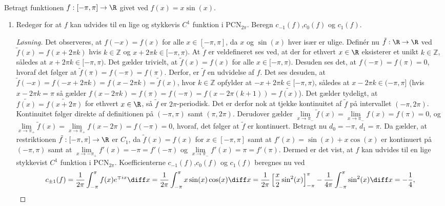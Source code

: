 \setcounter{section}{4}

\begin{opg}\hfill \\
	Betragt funktionen $ f:[-\pi,\pi]\to \R $ givet ved $ f(x)=x\sin(x) $.
	\begin{enumerate}
		\item Redegør for at $ f $ kan udvides til en lige og stykkevis $ C^1 $ funktion i $ \text{PCN}_{2\pi} $. Beregn $ c_{-1}(f) $,$ c_0(f) $ og $ c_1(f) $.
		\ifanswers
		\begin{proof}[Løsning]
			Det observeres, at $ f(-x)=f(x) $ for alle $ x\in[-\pi,\pi] $, da $ x $ og $ \sin(x) $ hver især er ulige. Definér nu $ \tilde{f}:\R\to\R $ ved $ \tilde{f}(x)=f(x+2\pi k) $ hvis $ k\in\mathbb{Z} $ og $ x+2\pi k\in[-\pi,\pi) $. At $ \tilde{f} $ er veldefineret ses ved, at der for ethvert $ x\in\R $ eksisterer et unikt $ k\in\mathbb{Z} $, således at $ x+2\pi k\in [-\pi,\pi) $.
			Det gælder trivielt, at $ \tilde{f}(x)=f(x) $ for alle $ x\in[-\pi,\pi) $. Desuden ses det, at $ f(-\pi)=f(\pi)=0 $, hvoraf det følger at $ \tilde{f}(\pi)=f(-\pi)=f(\pi) $. Derfor, er $ \tilde{f} $ en udvidelse af $ f $. Det ses desuden, at $ \tilde{f}(-x)=f(-x+2\pi k)=f(x-2\pi k)=\tilde{f}(x) $, hvor $ k\in\mathbb{Z} $ opfylder at $ -x+2\pi k\in[-\pi,\pi) $, således at $ x-2\pi k\in(-\pi,\pi] $ (hvis $ x-2\pi k=\pi $ så gælder $ f(x-2\pi k)=f(\pi)=f(-\pi)=f(x-2\pi(k+1))=\tilde{f(x)} $). Det gælder tydeligt, at $ \tilde{f(x)}=\tilde{f(x+2\pi)} $ for ethvert $ x\in\R $, så $ \tilde{f} $ er $ 2\pi $-periodisk. Det er derfor nok at tjekke kontinuitet af $ \tilde{f} $ på intervallet $ (-\pi,2\pi) $. Kontinuitet følger direkte af definitionen på $ (-\pi,\pi) $ samt $ (\pi,2\pi) $. Derudover gælder $ \lim\limits_{x\to\pi_-}\tilde{f}(x)=\lim\limits_{x\to\pi_-}f(x)=f(\pi)=0 $, og $ \lim\limits_{x\to\pi_+}\tilde{f}(x)=\lim\limits_{x\to\pi_+}f(x-2\pi)=f(-\pi)=0 $, hvoraf, det følger at $ \tilde{f} $ er kontinuert. Betragt nu $ d_0=-\pi $, $ d_1=\pi $. Da gælder, at restriktionen $ \tilde{f}:[-\pi,\pi]\to\R $ er $ C_1 $, da $ \tilde{f}(x)=f(x) $ for $ x\in[-\pi,\pi] $ samt at $ f'(x)=\sin(x)+x\cos(x) $ er kontinuert på $ (-\pi,\pi) $ samt at $ \lim\limits_{x\to-\pi_+}f'(x)=-\pi=f'(-\pi) $ og $ \lim\limits_{x\to\pi_-}f'(x)=\pi=f'(\pi) $. Dermed er det vist, at $ f $ kan udvides til en lige stykkevist $ C^1 $ funktion i $ \text{PCN}_{2\pi} $.
			Koefficienterne $ c_{-1}(f) $,$ c_0(f) $ og $ c_1(f) $ beregnes nu ved \begin{equation*}
			c_{\pm 1}(f)=\frac{1}{2\pi}\int_{-\pi}^{\pi}f(x)e^{\mp ix} \diff x=\frac{1}{2\pi}\int_{-\pi}^{\pi}x\sin(x)\cos(x) \diff x=\frac{1}{2\pi}\left[\frac{x}{2}\sin^2(x)\right]_{-\pi}^{\pi}-\frac{1}{4\pi}\int_{-\pi}^{\pi}\sin^2(x)\diff x=-\frac{1}{4},

\end{equation*}
\end{proof}
\end{enumerate}
\end{opg}
